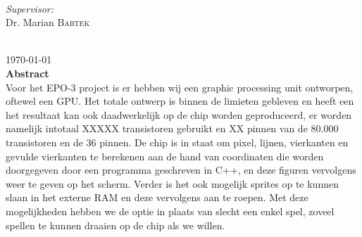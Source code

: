 \documentclass[12pt]{scrreprt}
\begin{document}
\begin{titlepage}
\begin{minipage}{0.4\textwidth}
\begin{flushleft}
\end{flushleft}
\end{minipage}
~
\begin{minipage}{0.4\textwidth}
\begin{flushright} \large
\emph{Supervisor:} \\
Dr. Marian \textsc{Bartek} %
\end{flushright}
\end{minipage}\\[3cm]



{\large \today}\\ [1.5cm]


 
% 

\textbf{Abstract} \\
Voor het EPO-3 project is er hebben wij een graphic processing unit ontworpen, oftewel een GPU. Het totale ontwerp is binnen de limieten gebleven en heeft een het resultaat kan ook daadwerkelijk op de chip worden geproduceerd, er worden namelijk intotaal XXXXX transistoren gebruikt en XX pinnen van de 80.000 transistoren en de 36 pinnen. De chip is in staat om pixel, lijnen, vierkanten en gevulde vierkanten te berekenen aan de hand van coordinaten die worden doorgegeven door een programma geschreven in C++, en deze figuren vervolgens weer te geven op het scherm. Verder is het ook mogelijk sprites op te kunnen slaan in het externe RAM en deze vervolgens aan te roepen. Met deze mogelijkheden hebben we de optie in plaats van slecht een enkel spel, zoveel spellen te kunnen draaien op de chip als we willen.

\vfill %

\end{titlepage}
\end{document}
